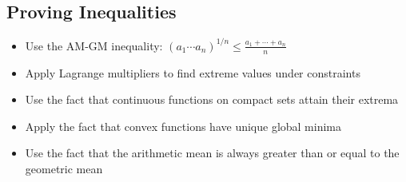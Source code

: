 \subsection*{Proving Inequalities}
\begin{itemize}
\item Use the AM-GM inequality: $(a_1 \cdots a_n)^{1/n} \leq \frac{a_1 + \cdots + a_n}{n}$
\item Apply Lagrange multipliers to find extreme values under constraints
\item Use the fact that continuous functions on compact sets attain their extrema
\item Apply the fact that convex functions have unique global minima
\item Use the fact that the arithmetic mean is always greater than or equal to the geometric mean
\end{itemize}